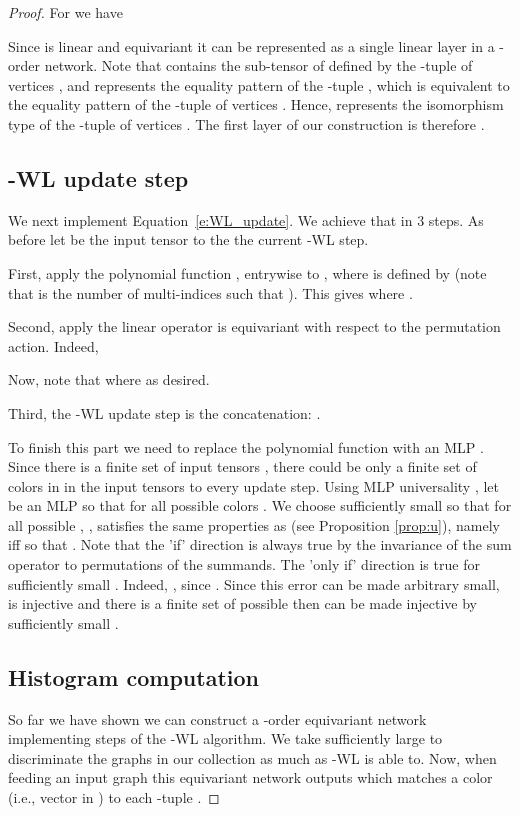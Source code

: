 \documentclass{article}
\newcommand{\ie}{{i.e.}}
\def\Eqref#1{Equation~\ref{#1}}
\begin{document}
\begin{proof}
For  we have 

Since  is linear and equivariant it can be represented as a single linear layer in a -order network. Note that  contains the sub-tensor of  defined by the -tuple of vertices , and  represents the equality pattern of the -tuple , which is equivalent to the equality pattern of the -tuple of vertices . Hence,  represents the isomorphism type of the -tuple of vertices . The first layer of our construction is therefore . 



\subsection{-WL update step} \label{sss:update_step}
We next implement \Eqref{e:WL_update}. We achieve that in 3 steps. As before let  be the input tensor to the the current -WL step.

First, apply the polynomial function ,  entrywise to , where  is defined by  (note that  is the number of multi-indices  such that ). This gives  where .

Second, apply the linear operator   
 is equivariant with respect to the permutation action. Indeed, 
 
Now, note that  where  as desired. 

Third, the -WL update step is the concatenation: . 


To finish this part we need to replace the polynomial function  with an MLP . Since there is a finite set of input tensors , there could be only a finite set  of colors in  in the input tensors to every update step. Using MLP universality \citep{cybenko1989approximation,hornik1991approximation} , let  be an MLP so that  for all possible colors .  We choose  sufficiently small so that for all possible , ,  satisfies the same properties as  (see Proposition \ref{prop:u}), namely  iff  so that . Note that the 'if' direction is always true by the invariance of the sum operator to permutations of the summands. The 'only if' direction is true for sufficiently small . Indeed, , since . Since this error can be made arbitrary small,  is injective and there is a finite set of possible  then  can be made injective by sufficiently small . 

\subsection{Histogram computation}
So far we have shown we can construct a -order equivariant network  implementing  steps of the -WL algorithm. We take  sufficiently large to discriminate the graphs in our collection as much as -WL is able to. Now, when feeding an input graph this equivariant network outputs  which matches a color  (\ie, vector in ) to each -tuple . 


\end{proof}
\end{document}
